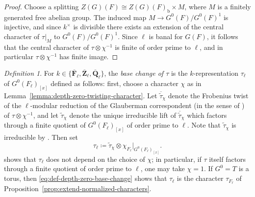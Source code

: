\documentclass[reqno]{amsart}
\numberwithin{equation}{subsection}
\newcommand{\F}{\mathbf{F}}
\newcommand{\wt}[1]{\widetilde{#1}}
\newcommand{\Q}{\mathbf{Q}}
\newcommand{\Z}{\mathbf{Z}}
\newcommand{\ol}[1]{\overline{#1}}
\theoremstyle{remark}
\newtheorem{defn}[thm]{Definition}
\numberwithin{equation}{subsection}
\numberwithin{figure}{subsection}
\begin{document}
\begin{proof}

Choose a splitting $Z(G)(F) \cong Z(G)(F)_{\mathrm{b}} \times M$, where $M$ is a finitely generated free abelian group. The induced map $M \to G^0(F)/G^0(F)^1$ is injective, and since $k^\times$ is divisible there exists an extension of the central character of $\tau|_M$ to $G^0(F)/G^0(F)^1$. Since $\ell$ is banal for $G(F)$, it follows that the central character of $\tau \otimes\chi^{-1}$ is finite of order prime to $\ell$, and in particular $\tau\otimes\chi^{-1}$ has finite image.
\end{proof}

\begin{defn}\label{def:depth-zero-base-change}
For $k \in \{\ol\F_\ell,\ol\Z_\ell,\ol\Q_\ell\}$, the \emph{base change of $\tau$} is the $k$-representation $\tau_\ell$ of $G^0(F_\ell)_{[x]}$ defined as follows: first, choose a character $\chi$ as in Lemma~\ref{lemma:depth-zero-twisting-character}. Let $\ol{\wt\tau}_\chi$ denote the Frobenius twist of the $\ell$-modular reduction of the Glauberman correspondent (in the sense of \cite[\S 3.5.3]{Cot26b}) of $\tau \otimes \chi^{-1}$, and let $\wt\tau_\chi$ denote the unique irreducible lift of $\ol{\wt\tau}_\chi$ which factors through a finite quotient of $G^0(F_\ell)_{[x]}$ of order prime to $\ell$. Note that $\wt\tau_\chi$ is irreducible by \cite[Part III, no.\ 15.5, Proposition 43]{Serre77}. Then set
\begin{equation}\label{eq:def-depth-zero-base-change}
\tau_\ell
\coloneqq
\wt\tau_{\chi}
\otimes
\chi_{F_\ell}\big|_{G^0(F_\ell)_{[x]}}.
\end{equation}
\cite[Remark~3.5.10]{Cot26b} shows that $\tau_\ell$ does not depend on the choice of $\chi$; in particular, if $\tau$ itself factors through a finite quotient of order prime to $\ell$, one may take $\chi=1$.
If $G^0=T$ is a torus, then \eqref{eq:def-depth-zero-base-change} shows that $\tau_\ell$ is the character $\tau_{F_\ell}$ of Proposition~\ref{prop:extend-normalized-characters}.
\end{defn}
\end{document}

